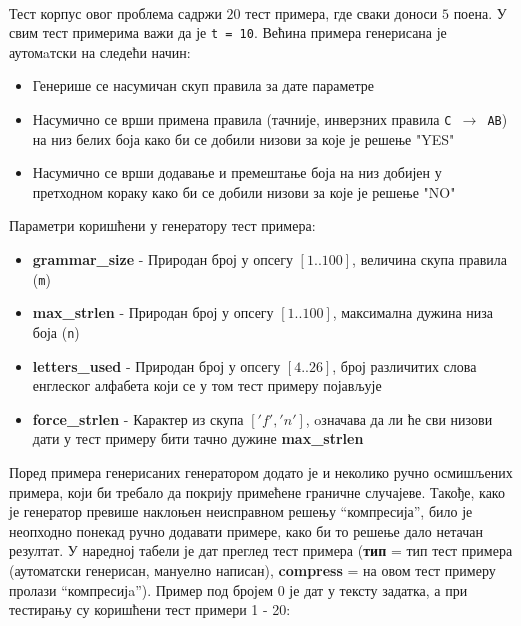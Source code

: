 \documentclass[a4wide]{article}
\begin{document}
\\
Тест корпус овог проблема садржи $20$ тест примера, где сваки доноси $5$ поена. У свим тест примерима важи да је {\tt t = 10}. Већина примера генерисана је аутомaтски на следећи начин:
\begin{itemize}
	\item Генерише се насумичан скуп правила за дате параметре
	\item Насумично се врши примена правила (тачније, инверзних правила {\tt C $\to$ AB}) на низ белих боја како би се добили низови за које је решење "YES"
	\item Насумично се врши додавање и премештање боја на низ добијен у претходном кораку како би се добили низови за које је решење "NO"
\end{itemize}
Параметри коришћени у генератору тест примера:
\begin{itemize}
	\item {\bf grammar\_size} - Природан број у опсегу $[1..100]$, величина скупа правила ({\tt m})
	\item {\bf max\_strlen} - Природан број у опсегу $[1..100]$, максимална дужина низа боја ({\tt n})
	\item {\bf letters\_used} - Природан број у опсегу $[4..26]$, број различитих слова енглеског алфабета који се у том тест примеру појављује
	\item {\bf force\_strlen }- Карактер из скупа $['f', 'n']$, oзначава да ли ће сви низови дати у тест примеру бити тачно дужине {\bf max\_strlen}
\end{itemize}
Поред примера генерисаних генератором додато је и неколико ручно осмишљених примера, који би требало да покрију примећене граничне случајеве. Такође, како је генератор превише наклоњен неисправном решењу ``компресија'', било је неопходно понекад ручно додавати примере, како би то решење дало нетачан резултат. У наредној табели је дат преглед тест примера ({\bf тип} = тип тест примера (аутоматски генерисан, мануелно написан), {\bf compress} = на овом тест примеру пролази ``компресијa''). Пример под бројем 0 је дат у тексту задатка, а при тестирању су коришћени тест примери 1 - 20:\\
\end{document}
